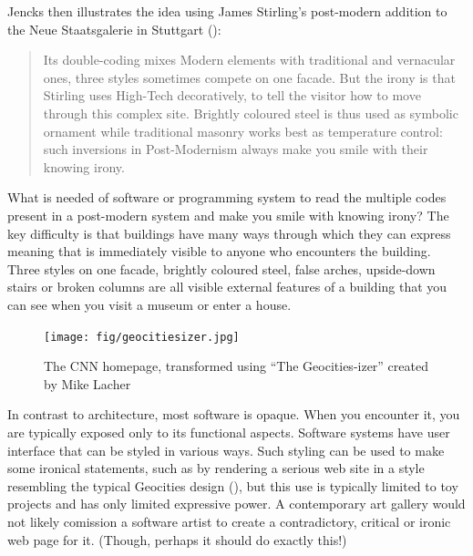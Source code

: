 Jencks then illustrates the idea using James Stirling's post-modern addition to the Neue
Staatsgalerie in Stuttgart ():

\begin{quote}
Its double-coding mixes Modern elements with traditional and vernacular ones, three styles
sometimes compete on one facade. But the irony is that Stirling uses High-Tech decoratively,
to tell the visitor how to move through this complex site. Brightly coloured steel is thus used
as symbolic ornament while traditional masonry works best as temperature control:
such inversions in Post-Modernism always make you smile with their knowing irony.
\end{quote}

What is needed of software or programming system to read the multiple codes present in a post-modern
system and make you smile with knowing irony? The key difficulty is that buildings have many
ways through which they can express meaning that is immediately visible to anyone who encounters
the building. Three styles on one facade, brightly coloured steel, false arches, upside-down
stairs or broken columns are all visible external features of a building that you can see
when you visit a museum or enter a house.

\begin{figure}
\centering
\vspace{-1em}
\texttt{[image: fig/geocitiesizer.jpg]}
\caption{The CNN homepage, transformed using ``The Geocities-izer'' created by Mike Lacher}
\label{fig:geocitiesizer}
\end{figure}

In contrast to architecture, most software is opaque. When you encounter it, you are typically
exposed only to its functional aspects. Software systems have user interface that can be styled
in various ways. Such styling can be used to make some ironical statements, such as by rendering
a serious web site in a style resembling the typical Geocities design (),
but this use is typically limited to toy projects and has only limited expressive power.
A contemporary art gallery would not likely comission a software artist to create a contradictory,
critical or ironic web page for it. (Though, perhaps it should do exactly this!)

